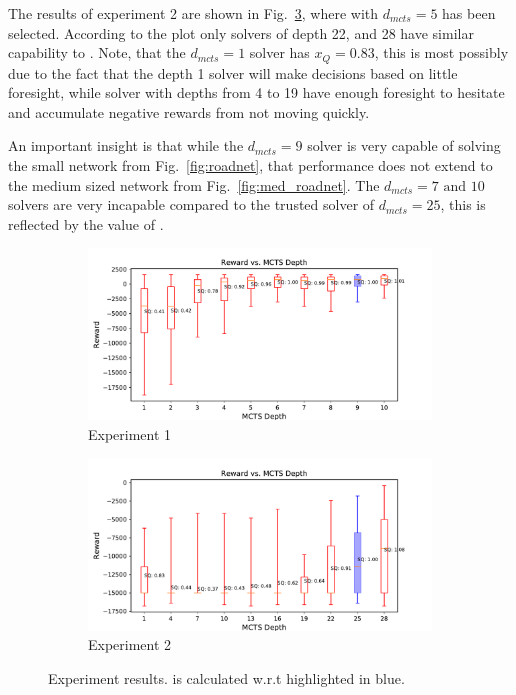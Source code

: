 The results of experiment 2 are shown in Fig.~\ref{fig:mcts_d_med}, where \solvestar{} with $d_{mcts}=5$ has been selected. According to the plot only solvers of depth 22, and 28 have similar capability to \solvestar{}. Note, that the $d_{mcts}=1$ solver has $x_Q=0.83$, this is most possibly due to the fact that the depth 1 solver will make decisions based on little foresight, while solver with depths from 4 to 19 have enough foresight to hesitate and accumulate negative rewards from not moving quickly.

An important insight is that while the $d_{mcts}=9$ solver is very capable of solving the small network from Fig.~\ref{fig:roadnet}, that performance does not extend to the medium sized network from Fig.~\ref{fig:med_roadnet}. The $d_{mcts}=7 \text{ and } 10$ solvers are very incapable compared to the trusted solver of $d_{mcts}=25$, this is reflected by the value of \xQ.

\begin{figure}[tbp]
    \centering
    \begin{subfigure}[b]{0.98\linewidth}
        \centering
        \includegraphics[width=0.9\linewidth]{Figures/sq_roadnet_mcts_i100e1000.pdf}
        \vfill
        \caption{Experiment 1}
        \label{fig:mcts_d}
    \end{subfigure}%
    \hfill
    \begin{subfigure}[b]{0.98\linewidth}
        \centering
        \includegraphics[width=0.9\linewidth]{Figures/sq_mednet_mcts_i1000e2000.pdf}
        \caption{Experiment 2}
        \label{fig:mcts_d_med}
    \end{subfigure} 
    \caption{Experiment results. \xQ{} is calculated w.r.t \solvestar{} highlighted in blue.}
    \vspace{-0.5cm}
\end{figure}

